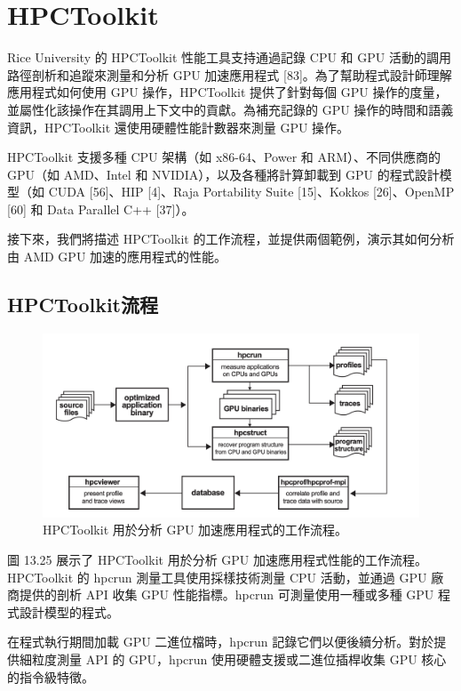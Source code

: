 \section{HPCToolkit}

Rice University 的 HPCToolkit 性能工具支持通過記錄 CPU 和 GPU 活動的調用路徑剖析和追蹤來測量和分析 GPU 加速應用程式 [83]。為了幫助程式設計師理解應用程式如何使用 GPU 操作，HPCToolkit 提供了針對每個 GPU 操作的度量，並屬性化該操作在其調用上下文中的貢獻。為補充記錄的 GPU 操作的時間和語義資訊，HPCToolkit 還使用硬體性能計數器來測量 GPU 操作。

HPCToolkit 支援多種 CPU 架構（如 x86-64、Power 和 ARM）、不同供應商的 GPU（如 AMD、Intel 和 NVIDIA），以及各種將計算卸載到 GPU 的程式設計模型（如 CUDA [56]、HIP [4]、Raja Portability Suite [15]、Kokkos [26]、OpenMP [60] 和 Data Parallel C++ [37]）。

接下來，我們將描述 HPCToolkit 的工作流程，並提供兩個範例，演示其如何分析由 AMD GPU 加速的應用程式的性能。


\subsection{HPCToolkit流程}

\begin{figure}
    \centering
    \includegraphics[width=0.9\linewidth]{FileAusiliari/Screenshots/Figure13-25.png}
    \caption{HPCToolkit 用於分析 GPU 加速應用程式的工作流程。}
    \label{fig:PAPI25}
\end{figure}

圖 13.25 展示了 HPCToolkit 用於分析 GPU 加速應用程式性能的工作流程。HPCToolkit 的 hpcrun 測量工具使用採樣技術測量 CPU 活動，並通過 GPU 廠商提供的剖析 API 收集 GPU 性能指標。hpcrun 可測量使用一種或多種 GPU 程式設計模型的程式。

在程式執行期間加載 GPU 二進位檔時，hpcrun 記錄它們以便後續分析。對於提供細粒度測量 API 的 GPU，hpcrun 使用硬體支援或二進位插桿收集 GPU 核心的指令級特徵。

